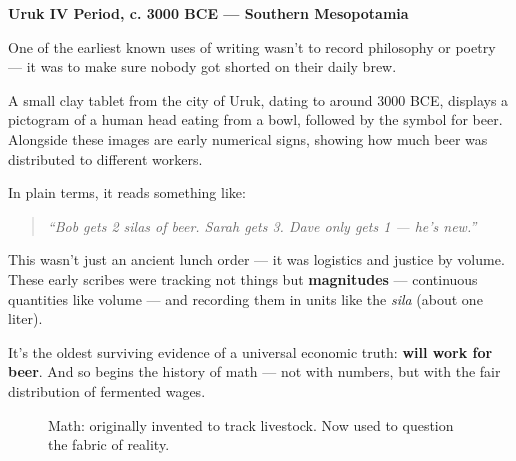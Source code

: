 \begin{tcolorbox}[title=Historical Sidebar: \textit{Will Work for Beer}, colback=gray!5, colframe=black, fonttitle=\bfseries]

  \textbf{Uruk IV Period, c. 3000 BCE — Southern Mesopotamia}
  
  One of the earliest known uses of writing wasn’t to record philosophy or poetry — it was to make sure nobody got shorted on their daily brew.
  
  A small clay tablet from the city of Uruk, dating to around 3000 BCE, displays a pictogram of a human head eating from a bowl, followed by the symbol for beer. Alongside these images are early numerical signs, showing how much beer was distributed to different workers.
  
  \medskip
  
  In plain terms, it reads something like:
  
  \begin{quote}
  \emph{“Bob gets 2 silas of beer. Sarah gets 3. Dave only gets 1 — he’s new.”}
  \end{quote}
  
  \medskip
  
  This wasn’t just an ancient lunch order — it was logistics and justice by volume. These early scribes were tracking not things but \textbf{magnitudes} — continuous quantities like volume — and recording them in units like the \textit{sila} (about one liter).
  
  \medskip
  
  It’s the oldest surviving evidence of a universal economic truth: \textbf{will work for beer}. And so begins the history of math — not with numbers, but with the fair distribution of fermented wages.
  
\end{tcolorbox}
  



\begin{figure}[H]
\centering
{}
\caption{Math: originally invented to track livestock. Now used to question the fabric of reality.}
\end{figure}